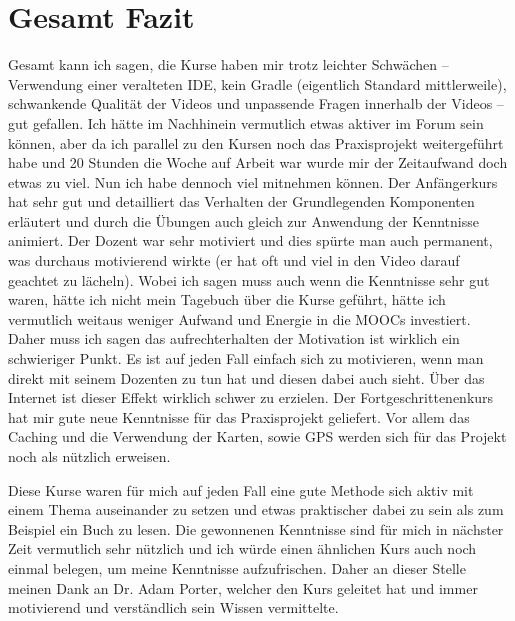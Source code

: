 \documentclass[12pt,a4paper,bibliography=totocnumbered,listof=totocnumbered]{scrartcl}
\begin{document}
\pagebreak

\section{Gesamt Fazit}

Gesamt kann ich sagen, die Kurse haben mir trotz leichter Schwächen – Verwendung einer veralteten IDE, kein Gradle (eigentlich Standard mittlerweile), schwankende Qualität der Videos und unpassende Fragen innerhalb der Videos  – gut gefallen. Ich hätte im Nachhinein vermutlich etwas aktiver im Forum sein können, aber da ich parallel zu den Kursen noch das Praxisprojekt weitergeführt habe und 20 Stunden die Woche auf Arbeit war wurde mir der Zeitaufwand doch etwas zu viel. Nun ich habe dennoch viel mitnehmen können. Der Anfängerkurs hat sehr gut und detailliert das Verhalten der Grundlegenden Komponenten erläutert und durch die Übungen auch gleich zur Anwendung der Kenntnisse animiert. Der Dozent war sehr motiviert und dies spürte man auch permanent, was durchaus motivierend wirkte (er hat oft und viel in den Video darauf geachtet zu lächeln). Wobei ich sagen muss auch wenn die Kenntnisse sehr gut waren, hätte ich nicht mein Tagebuch über die Kurse geführt, hätte ich vermutlich weitaus weniger Aufwand und Energie in die MOOCs investiert. Daher muss ich sagen das aufrechterhalten der Motivation ist wirklich ein schwieriger Punkt. Es ist auf jeden Fall einfach sich zu motivieren, wenn man direkt mit seinem Dozenten zu tun hat und diesen dabei auch sieht. Über das Internet ist dieser Effekt wirklich schwer zu erzielen. 
Der Fortgeschrittenenkurs hat mir gute neue Kenntnisse für das Praxisprojekt geliefert. Vor allem das Caching und die Verwendung der Karten, sowie GPS werden sich für das Projekt noch als nützlich erweisen. 

Diese Kurse waren für mich auf jeden Fall eine gute Methode sich aktiv mit einem Thema auseinander zu setzen und etwas praktischer dabei zu sein als zum Beispiel ein Buch zu lesen. Die gewonnenen Kenntnisse sind für mich in nächster Zeit vermutlich sehr nützlich und ich würde einen ähnlichen Kurs auch noch einmal belegen, um meine Kenntnisse aufzufrischen. Daher an dieser Stelle meinen Dank an Dr. Adam Porter, welcher den Kurs geleitet hat und immer motivierend und verständlich sein Wissen vermittelte. 

\pagebreak
\end{document}
